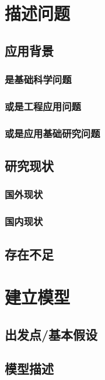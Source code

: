\documentclass[UTF8,12pt]{ctexart}
\begin{document}
\newpage
\section{描述问题}

\subsection{应用背景}

\subsubsection{是基础科学问题}

\subsubsection{或是工程应用问题}

\subsubsection{或是应用基础研究问题}

\subsection{研究现状}

\subsubsection{国外现状}

\subsubsection{国内现状}

\subsection{存在不足}

\newpage
\section{建立模型}

\subsection{出发点/基本假设}

\subsection{模型描述}
\end{document}
